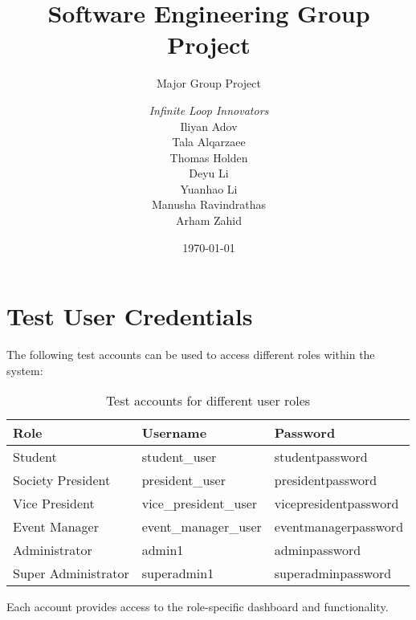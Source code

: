 \documentclass[a4paper, 12pt]{report}
\title{Software Engineering Group Project}
\subtitle{Major Group Project}%
\author{\textit{Infinite Loop Innovators}\\  %
    Iliyan Adov\\                        %
    Tala Alqarzaee\\                        %
    Thomas Holden\\                       %
    Deyu Li\\                      %
    Yuanhao Li\\                        %
    Manusha Ravindrathas\\                      %
    Arham Zahid\\                       %
}
\date{\today}
\begin{document}
    \maketitle
    \romantableofcontents

    
    
    
    
    
    

    \appendix
    \chapter{Test User Credentials}
    \label{app:credentials}
    
    The following test accounts can be used to access different roles within the system:
    
    \begin{table}[h]
    \centering
    \begin{tabular}{|l|l|l|}
    \hline
    \textbf{Role} & \textbf{Username} & \textbf{Password} \\
    \hline
    Student & student\_user & studentpassword \\
    \hline
    Society President & president\_user & presidentpassword \\
    \hline
    Vice President & vice\_president\_user & vicepresidentpassword \\
    \hline
    Event Manager & event\_manager\_user & eventmanagerpassword \\
    \hline
    Administrator & admin1 & adminpassword \\
    \hline
    Super Administrator & superadmin1 & superadminpassword \\
    \hline
    \end{tabular}
    \caption{Test accounts for different user roles}
    \label{tab:test-accounts}
    \end{table}
    
    Each account provides access to the role-specific dashboard and functionality.
\end{document}
